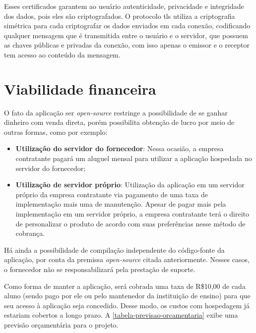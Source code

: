 \documentclass[
    12pt,               %
    openright,          %
    oneside,
    a4paper,            %
    english,            %
    brazil              %
    ]{ifsp-spo-inf-ctds} %
\begin{document}
Esses certificados garantem ao usuário autenticidade, privacidade e integridade dos dados, pois eles são criptografados. O protocolo \ac{tls} utiliza a criptografia simétrica para cada criptografar os dados enviados em cada conexão, codificando qualquer mensagem que é transmitida entre o usuário e o servidor, que possuem as chaves públicas e privadas da conexão, com isso apenas o emissor e o receptor tem acesso ao conteúdo da mensagem.


\section{Viabilidade financeira}
O fato da aplicação ser \textit{\gls{open-source}} restringe a possibilidade de se ganhar dinheiro com venda direta, porém possibilita obtenção de lucro por meio de outras formas, como por exemplo:

\begin{itemize}
   \item \textbf{Utilização do servidor do fornecedor}: Nessa ocasião, a empresa contratante pagará um aluguel mensal para utilizar a aplicação hospedada no servidor do fornecedor;
   \item \textbf{Utilização de servidor próprio}: Utilização da aplicação em um servidor próprio da empresa contratante via pagamento de uma taxa de implementação mais uma de manutenção. Apesar de pagar mais pela implementação em um servidor próprio, a empresa contratante terá o direito de personalizar o produto de acordo com suas preferências nesse método de cobrança.
\end{itemize}

Há ainda a possibilidade de compilação independente do código-fonte da aplicação, por conta da premissa \textit{\gls{open-source}} citada anteriormente. Nesses casos, o fornecedor não se responsabilizará pela prestação de suporte.


Como forma de manter a aplicação, será cobrada uma taxa de R\$10,00 de cada aluno (sendo pago por ele ou pelo mantenedor da instituição de ensino) para que seu acesso à aplicação seja concedido. Desse modo, os custos com hospedagem já estariam cobertos a longo prazo. A \autoref{tabela-previsao-orcamentaria} exibe uma previsão orçamentária para o projeto.
\end{document}
